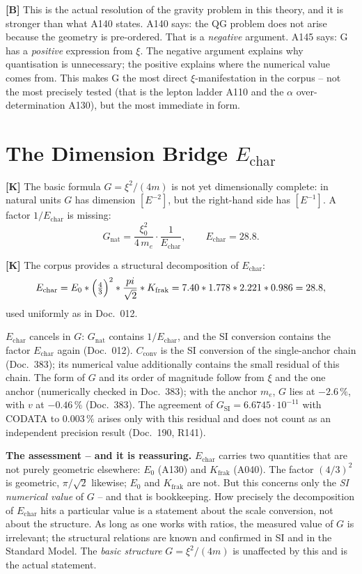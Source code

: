 \textbf{[B]} This is the actual resolution of the gravity problem in this theory,
and it is stronger than what A140 states. A140 says: the QG problem does not arise
because the geometry is pre-ordered. That is a \emph{negative} argument. A145 says:
G has a \emph{positive} expression from $\xi$. The negative argument explains why
quantisation is unnecessary; the positive explains where the numerical value comes
from. This makes G the most direct $\xi$-manifestation in the corpus -- not the
most precisely tested (that is the lepton ladder A110 and the $\alpha$ over-determination
A130), but the most immediate in form.

\section{The Dimension Bridge $E_\text{char}$}

\textbf{[K]} The basic formula $G=\xi^2/(4m)$ is not yet dimensionally complete:
in natural units $G$ has dimension $[E^{-2}]$, but the right-hand side has $[E^{-1}]$.
A factor $1/E_\text{char}$ is missing:
\[
  G_\text{nat} = \frac{\xi_0^2}{4\,m_e}\cdot\frac{1}{E_\text{char}},
  \qquad E_\text{char} = 28{.}8 .
\]

\textbf{[K]} The corpus provides a structural decomposition of $E_\text{char}$:
\[
  E_\text{char} = E_0\cdot\Bigl(\tfrac43\Bigr)^2\cdot\frac{\pi}{\sqrt2}\cdot
  K_\text{frak} = 7{.}40\cdot 1{.}778\cdot 2{.}221\cdot 0{.}986 = 28{.}8 ,
\]
used uniformly as in Doc.~012.

$E_\text{char}$ cancels in $G$: $G_\text{nat}$ contains $1/E_\text{char}$, and the SI conversion contains the factor $E_\text{char}$ again (Doc.~012). $C_\text{conv}$ is the SI conversion of the single-anchor chain (Doc.~383); its numerical value additionally contains the small residual of this chain. The form of $G$ and its order of magnitude follow from $\xi$ and the one anchor (numerically checked in Doc.~383); with the anchor $m_e$, $G$ lies at $-2{.}6\,\%$, with $v$ at $-0{.}46\,\%$ (Doc.~383). The agreement of $G_\text{SI} = 6{.}6745\cdot10^{-11}$ with CODATA to $0{.}003\,\%$ arises only with this residual and does not count as an independent precision result (Doc.~190, R141).

\textbf{The assessment -- and it is reassuring.} $E_\text{char}$ carries two quantities
that are not purely geometric elsewhere: $E_0$ (A130) and $K_\text{frak}$ (A040).
The factor $(4/3)^2$ is geometric, $\pi/\sqrt2$ likewise; $E_0$ and $K_\text{frak}$
are not. But this concerns only the \emph{SI numerical value} of $G$ -- and that is
bookkeeping. How precisely the decomposition of $E_\text{char}$ hits a particular value is a statement about the
scale conversion, not about the structure. As long as one works with ratios, the
measured value of $G$ is irrelevant; the structural relations are known and confirmed
in SI and in the Standard Model. The \emph{basic structure} $G = \xi^2/(4m)$ is
unaffected by this and is the actual statement.

